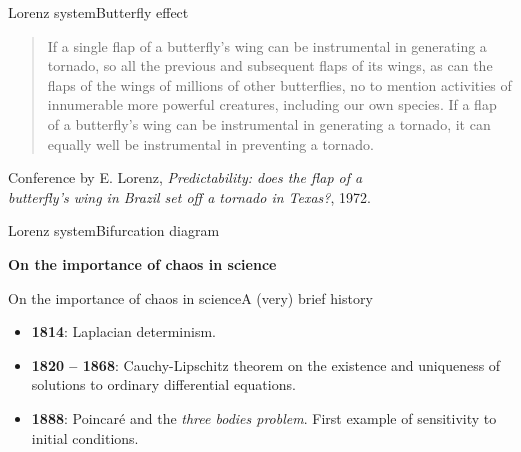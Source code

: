 \documentclass[usenames,dvipsnames,svgnames,10pt,aspectratio=169]{beamer}
\begin{document}
\begin{frame}[t, c]{Lorenz system}{Butterfly effect}
	\begin{quote}
		If a single flap of a butterfly's wing can be instrumental in generating a tornado, so all the previous and subsequent flaps of its wings, as can the flaps of the wings of millions of other butterflies, no to mention activities of innumerable more powerful creatures, including our own species. If a flap of a butterfly's wing can be instrumental in generating a tornado, it can equally well be instrumental in preventing a tornado.
	\end{quote}

	\begin{flushright}
		Conference by E. Lorenz, \emph{Predictability: does the flap of a \\ butterfly's wing in Brazil set off a tornado in Texas?}, 1972.
	\end{flushright}

	\vspace{1cm}
\end{frame}

\begin{frame}[t, c]{Lorenz system}{Bifurcation diagram}

\end{frame}

\begin{frame}[t, c]{}
	\centering
	\vspace{1cm}

	{\Large \textbf{On the importance of chaos in science}}

	\bigskip

	{}

\end{frame}

\begin{frame}[t, c]{On the importance of chaos in science}{A (very) brief history}
	\begin{itemize}
		\item \alert{\textbf{1814}}: Laplacian determinism.

		\bigskip

		\item \alert{\textbf{1820 -- 1868}}: Cauchy-Lipschitz theorem on the existence and uniqueness of solutions to ordinary differential equations.

		\bigskip

		\item \alert{\textbf{1888}}: Poincaré and the \emph{three bodies problem}. First example of sensitivity to initial conditions.
	\end{itemize}

	\vspace{1cm}
\end{frame}
\end{document}
